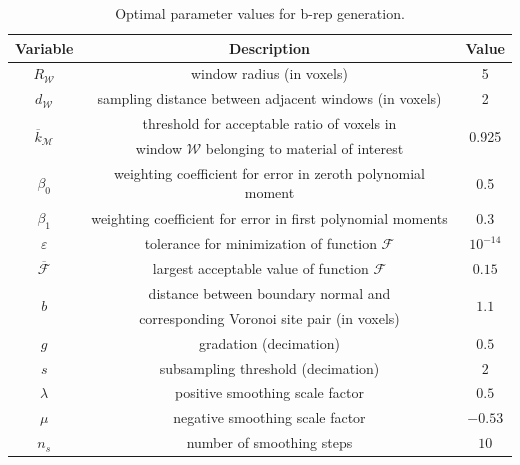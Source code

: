 \begin{table}[h!]
 \centering
   \begin{tabular}{|c||c|c|}
   \hline 
   \textbf{Variable} & \textbf{Description} & \textbf{Value} \\ \hline \hline
   $R_{\mathcal{W}}$ & window radius (in voxels) & 5 \\ \hline
   $d_{\mathcal{W}}$ & sampling distance between adjacent windows (in voxels) & 2 \\ \hline
   \multirow{2}{*}{$\overline{k}_{\mathcal{M}}$ \rule{0mm}{4mm}} & threshold for acceptable ratio of voxels in & \multirow{2}{*}{0.925} \\
   {} & window $\mathcal{W}$ belonging to material of interest & {} \\ \hline
   $\beta_0$ & weighting coefficient for error in zeroth polynomial moment & 0.5 \\ \hline
   $\beta_1$ & weighting coefficient for error in first polynomial moments & 0.3 \\ \hline   
   $\varepsilon$ & tolerance for minimization of function $\mathcal{F}$ & $10^{-14}$ \rule{0mm}{4mm} \\ \hline
   $\overline{\mathcal{F}}$ \rule{0mm}{4mm} & largest acceptable value of function $\mathcal{F}$ & $0.15$ \\ \hline
   \multirow{2}{*}{$b$} & distance between boundary normal and & \multirow{2}{*}{$1.1$} \\
   {} & corresponding Voronoi site pair (in voxels) & {} \\ \hline
   ${g}$ & {gradation (decimation)} & ${0.5}$ \\ \hline
   ${s}$ & {subsampling threshold (decimation)} & ${2}$ \\ \hline
   ${\lambda}$ & {positive smoothing scale factor} & ${0.5}$ \\ \hline
   ${\mu}$ & {negative smoothing scale factor} & ${-0.53}$ \\ \hline
   ${n_s}$ & {number of smoothing steps} & ${10}$ \\ \hline
\end{tabular}
\caption{Optimal parameter values for b-rep generation.}
\label{tab:Mod5}
\end{table}

